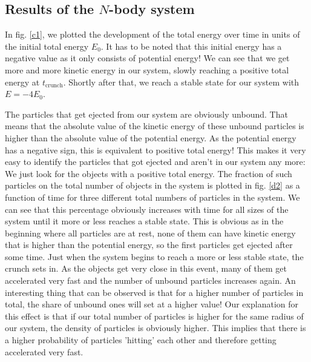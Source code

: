 \documentclass[10pt,a4paper]{article}
\begin{document}
\subsection{Results of the $N$-body system}
In fig. \ref{c1}, we plotted the development of the total energy over time in units of the initial total energy $E_0$. It has to be noted that this initial energy has a negative value as it only consists of potential energy! We can see that we get more and more kinetic energy in our system, slowly reaching a positive total energy at $t_\mathrm{crunch}$. Shortly after that, we reach a stable state for our system with $E=-4E_0$.

The particles that get ejected from our system are obviously unbound. That means that the absolute value of the kinetic energy of these unbound particles is higher than the absolute value of the potential energy. As the potential energy has a negative sign, this is equivalent to positive total energy! This makes it very easy to identify the particles that got ejected and aren't in our system any more: We just look for the objects with a positive total energy. The fraction of such particles on the total number of objects in the system is plotted in fig. \ref{d2} as a function of time for three different total numbers of particles in the system. We can see that this percentage obviously increases with time for all sizes of the system until it more or less reaches a stable state. This is obvious as in the beginning where all particles are at rest, none of them can have kinetic energy that is higher than the potential energy, so the first particles get ejected after some time. Just when the system begins to reach a more or less stable state, the crunch sets in. As the objects get very close in this event, many of them get accelerated very fast and the number of unbound particles increases again. An interesting thing that can be observed is that for a higher number of particles in total, the share of unbound ones will set at a higher value! Our explanation for this effect is that if our total number of particles is higher for the same radius of our system, the density of particles is obviously higher. This implies that there is a higher probability of particles 'hitting' each other and therefore getting accelerated very fast.
\end{document}
